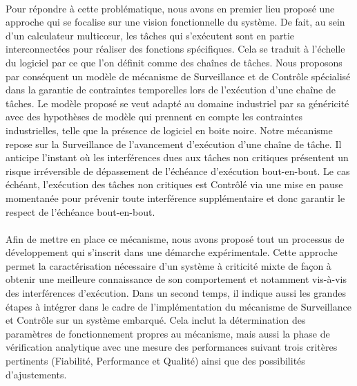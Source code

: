 \documentclass[a4paper,11pt,twoside]{StyleThese}
\begin{document}
\paragraph*{} Pour répondre à cette problématique, nous avons en premier lieu proposé une approche qui se focalise sur une vision fonctionnelle du système. De fait, au sein d'un calculateur multicœur, les tâches qui s'exécutent sont en partie interconnectées pour réaliser des fonctions spécifiques. Cela se traduit à l'échelle du logiciel par ce que l'on définit comme des chaînes de tâches. Nous proposons par conséquent un modèle de mécanisme de Surveillance et de Contrôle spécialisé dans la garantie de contraintes temporelles lors de l'exécution d'une chaîne de tâches. Le modèle proposé se veut adapté au domaine industriel par sa généricité avec des hypothèses de modèle qui prennent en compte les contraintes industrielles, telle que la présence de logiciel en boite noire.
Notre mécanisme repose sur la Surveillance de l'avancement d'exécution d'une chaîne de tâche. Il anticipe l'instant où les interférences dues aux tâches non critiques présentent un risque irréversible de dépassement de l'échéance d'exécution bout-en-bout. Le cas échéant, l'exécution des tâches non critiques est Contrôlé via une mise en pause momentanée pour prévenir toute interférence supplémentaire et donc garantir le respect de l'échéance bout-en-bout.

\pagebreak
\paragraph*{} Afin de mettre en place ce mécanisme, nous avons proposé tout un processus de développement qui s'inscrit dans une démarche expérimentale. Cette approche permet la caractérisation nécessaire d'un système à criticité mixte de façon à obtenir une meilleure connaissance de son comportement et notamment vis-à-vis des interférences d'exécution. Dans un second temps, il indique aussi les grandes étapes à intégrer dans le cadre de l'implémentation du mécanisme de Surveillance et Contrôle sur un système embarqué. Cela inclut la détermination des paramètres de fonctionnement propres au mécanisme, mais aussi la phase de vérification analytique avec une mesure des performances suivant trois critères pertinents (Fiabilité, Performance et Qualité) ainsi que des possibilités d'ajustements.
\end{document}
